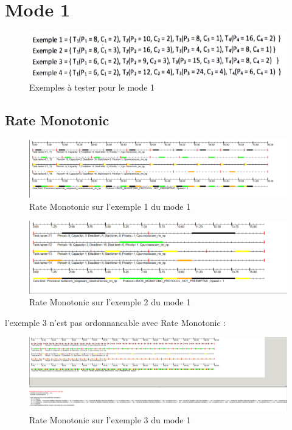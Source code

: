 \section{Mode 1}{
  \bigskip\begin{figure}[H]
    \centering
    \includegraphics[width=16cm]{
      img/mode1/exemples.png
    }
    \caption{Exemples à tester pour le mode 1}
  \end{figure}\bigskip


  \subsection{Rate Monotonic}{
    \begin{figure}[H]
      \centering
      \includegraphics[width=16cm]{
        img/mode1/rm/ex1.png
      }
      \caption{Rate Monotonic sur l'exemple 1 du mode 1}
    \end{figure}

    \begin{figure}[H]
      \centering
      \includegraphics[width=16cm]{
        img/mode1/rm/ex2.png
      }
      \caption{Rate Monotonic sur l'exemple 2 du mode 1}
    \end{figure}

    l'exemple 3 n'est pas ordonnancable avec Rate Monotonic :
    \begin{figure}[H]
      \centering
      \includegraphics[width=16cm]{
        img/mode1/rm/ex3_no.png
      }
      \caption{Rate Monotonic sur l'exemple 3 du mode 1}
    \end{figure}
    \bigskip

}}
